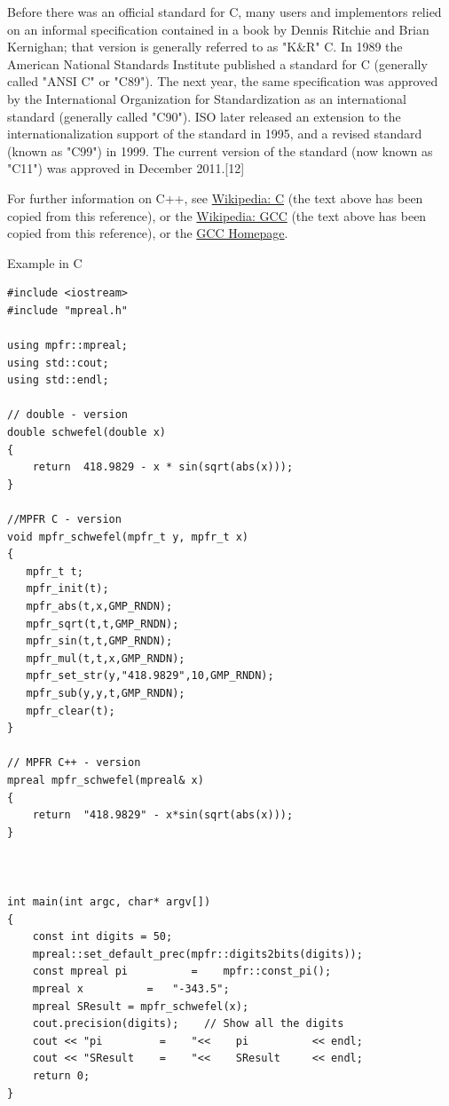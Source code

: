 \vpara
Before there was an official standard for C, many users and implementors relied on an informal specification contained in a book by Dennis Ritchie and Brian Kernighan; that version is generally referred to as "K\&R" C. In 1989 the American National Standards Institute published a standard for C (generally called "ANSI C" or "C89"). The next year, the same specification was approved by the International Organization for Standardization as an international standard (generally called "C90"). ISO later released an extension to the internationalization support of the standard in 1995, and a revised standard (known as "C99") in 1999. The current version of the standard (now known as "C11") was approved in December 2011.[12]


\vpara
For further information on C++, see \href{http://en.wikipedia.org/wiki/C_(programming_language)}{Wikipedia: C} (the text above has been copied from this reference), or the  \href{http://en.wikipedia.org/wiki/GNU_Compiler_Collection}{Wikipedia: GCC} (the text above has been copied from this reference), or the  \href{http://gcc.gnu.org/}{GCC Homepage}.



\vpara
Example in C


\begin{lstlisting}
#include <iostream>
#include "mpreal.h"

using mpfr::mpreal;    
using std::cout;
using std::endl;

// double - version
double schwefel(double x)
{
    return  418.9829 - x * sin(sqrt(abs(x)));
}
 
//MPFR C - version
void mpfr_schwefel(mpfr_t y, mpfr_t x)
{
   mpfr_t t;
   mpfr_init(t);
   mpfr_abs(t,x,GMP_RNDN);
   mpfr_sqrt(t,t,GMP_RNDN);
   mpfr_sin(t,t,GMP_RNDN);
   mpfr_mul(t,t,x,GMP_RNDN);
   mpfr_set_str(y,"418.9829",10,GMP_RNDN);
   mpfr_sub(y,y,t,GMP_RNDN);
   mpfr_clear(t);
}

// MPFR C++ - version
mpreal mpfr_schwefel(mpreal& x)
{
    return  "418.9829" - x*sin(sqrt(abs(x)));
}



int main(int argc, char* argv[])
{
    const int digits = 50; 
    mpreal::set_default_prec(mpfr::digits2bits(digits));
    const mpreal pi          =    mpfr::const_pi();
	mpreal x          =   "-343.5"; 
    mpreal SResult = mpfr_schwefel(x);
    cout.precision(digits);    // Show all the digits
    cout << "pi         =    "<<    pi          << endl;    
    cout << "SResult    =    "<<    SResult     << endl;   
    return 0;
}
\end{lstlisting}



